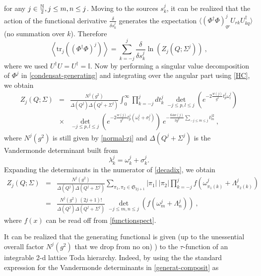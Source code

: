 \documentclass[a4paper,11pt,twoside]{article}
\numberwithin{equation}{section}
\newcommand\bbone{{ \mathbb{I}}}
\theoremstyle{nonumberplain}
\newcounter{and}
\begin{document}
%
for any $j\in\frac{\mathbb{N}}{2}, \-j\le m,n\le j$. Moving to the sources $s^j_k$, it can be realized that the action of the functional derivative $\frac{\delta}{\delta s^j_k}$ generates the expectation $\langle (\Phi^\dag\Phi)^j_{qr}U_{rk}U^\dag_{kq}\rangle$ (no summation over $k$). Therefore%
%
\begin{equation}
\left\langle \mbox{tr}_j \left((\Phi^\dag\Phi)^j\right) \right\rangle = \sum_{k=-j}^j\frac{\delta}{\delta s^j_k}\ln(Z_j(Q;\Sigma^j)) \ ,
\end{equation}
%
where we used $U^\dag U=U^\dag=\bbone$. Now by performing a singular value decomposition of $\Phi^j$ in \eqref{condensat-generating} and integrating over the angular part 
using \eqref{HC}, we obtain%
%
\begin{eqnarray}
Z_j(Q;\Sigma) &=& \frac{N^j(g^2)}{\Delta(Q^j)\Delta(Q^j+\Sigma^j)} \int_0^\infty\prod_{k=-j}^jdt^j_k \ \det_{-j\le p,l\le j}\left(e^{-2\frac{w(j)}{g^2}t^j_p\omega^j_{l}}\right) \nonumber \\
&\times& \det_{-j\le p,l\le j}\left(e^{-2\frac{w(j)}{g^2}t^j_p(\omega^j_{l}+\sigma^j_l)}\right) \ 
e^{-\frac{64w(j)}{3g^2} \underset{-j\leq m \leq j}{\sum} t^{j2}_m} \ , \label{decadix}
\end{eqnarray}
%
where $N^j(g^2)$ is still given by \eqref{normal-zj} and $\Delta(Q^j+\Sigma^j)$ is the Vandermonde determinant built from%
%
\begin{equation}
\lambda^j_k=\omega^j_k+\sigma^j_k. 
\end{equation}
%
Expanding the determinants in the numerator of \eqref{decadix}, we obtain%
%
\begin{eqnarray}
Z_j(Q;\Sigma)&=& \frac{N^j(g^2)}{\Delta(Q^j)\Delta(Q^j+\Sigma^j)} \sum_{\pi_1,\pi_2\in\mathfrak{S}_{2j+1}} \left|\pi_1\right| \ \left|\pi_2\right| \prod_{k=-j}^j f\left(\omega^j_{\pi_1(k)}+\Lambda^j_{\pi_2(k)}\right) \nonumber\\
&=& \frac{N^j(g^2) \ (2j+1)!}{\Delta(Q^j)\Delta(Q^j+\Sigma^j)} \ \det_{-j\le m,n\le j}\left(f\left(\omega^j_m+\Lambda^j_n\right)\right) \ , \label{generat-composit}
\end{eqnarray}
%
where $f(x)$ can be read off from \eqref{functionspect}.\par%
%
It can be realized that the generating functional is given (up to the unessential overall factor $N^j(g^2)$ that we drop from no on)  ) to the $\tau$-function of an integrable 2-d lattice Toda hierarchy. Indeed, by using the the standard expression for the Vandermonde determinants in \eqref{generat-composit} as%
\end{document}
